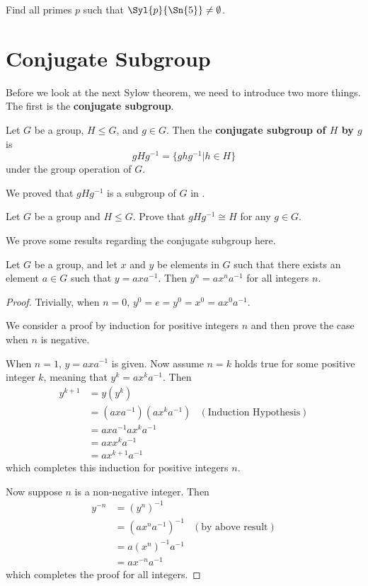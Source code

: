 \begin{exercise}
    Find all primes $p$ such that $\Syl{p}{\Sn{5}} \neq \emptyset$.
\end{exercise}

\section{Conjugate Subgroup}
Before we look at the next Sylow theorem, we need to introduce two more things. The first is the \textbf{conjugate subgroup}.
\begin{definition}
    Let $G$ be a group, $H \leq G$, and $g \in G$. Then the \textbf{conjugate subgroup of $H$ by $g$} is
    \[
        gHg^{-1} = \{ghg^{-1} \vert h \in H\}
    \]
    under the group operation of $G$.
\end{definition}
We proved that $gHg^{-1}$ is a subgroup of $G$ in .

\begin{exercise}\label{exercise-conjugate-subgroup-isomorphic-to-subgroup}
    Let $G$ be a group and $H \leq G$. Prove that $gHg^{-1} \cong H$ for any $g \in G$.
\end{exercise}

We prove some results regarding the conjugate subgroup here.
\begin{proposition}\label{prop-power-of-conjugate-equals-conjugate-of-power}
    Let $G$ be a group, and let $x$ and $y$ be elements in $G$ such that there exists an element $a \in G$ such that $y = axa^{-1}$. Then $y^n = ax^na^{-1}$ for all integers $n$.
\end{proposition}
\begin{proof}
    Trivially, when $n = 0$, $y^0 = e = y^0 = x^0 = ax^0a^{-1}$.

    We consider a proof by induction for positive integers $n$ and then prove the case when $n$ is negative.

    When $n = 1$, $y = axa^{-1}$ is given. Now assume $n = k$ holds true for some positive integer $k$, meaning that $y^k = ax^ka^{-1}$. Then
    \begin{align*}
        y^{k+1} &= y(y^k)\\
        &= (axa^{-1})(ax^ka^{-1}) & (\text{Induction Hypothesis})\\
        &= axa^{-1}ax^ka^{-1}\\
        &= axx^ka^{-1}\\
        &= ax^{k+1}a^{-1}
    \end{align*}
    which completes this induction for positive integers $n$.

    Now suppose $n$ is a non-negative integer. Then
    \begin{align*}
        y^{-n} &= (y^n)^{-1}\\
        &= (ax^na^{-1})^{-1} & (\text{by above result})\\
        &= a(x^n)^{-1}a^{-1}\\
        &= ax^{-n}a^{-1}
    \end{align*}
    which completes the proof for all integers.
\end{proof}


